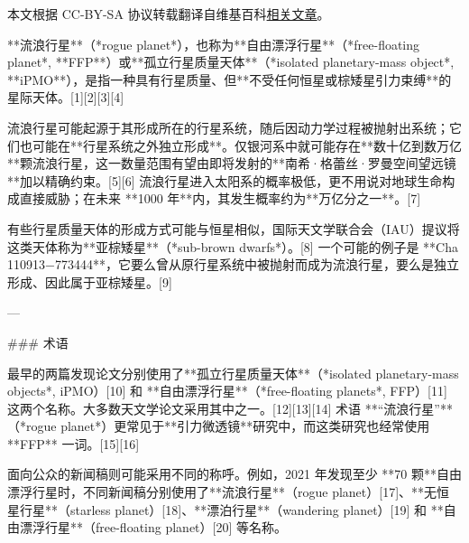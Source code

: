 
本文根据 CC-BY-SA 协议转载翻译自维基百科\href{https://en.wikipedia.org/wiki/Rogue_planet}{相关文章}。



**流浪行星**（*rogue planet*），也称为**自由漂浮行星**（*free-floating planet*, **FFP**）或**孤立行星质量天体**（*isolated planetary-mass object*, **iPMO**），是指一种具有行星质量、但**不受任何恒星或棕矮星引力束缚**的星际天体。[1][2][3][4]

流浪行星可能起源于其形成所在的行星系统，随后因动力学过程被抛射出系统；它们也可能在**行星系统之外独立形成**。仅银河系中就可能存在**数十亿到数万亿**颗流浪行星，这一数量范围有望由即将发射的**南希·格蕾丝·罗曼空间望远镜**加以精确约束。[5][6] 流浪行星进入太阳系的概率极低，更不用说对地球生命构成直接威胁；在未来 **1000 年**内，其发生概率约为**万亿分之一**。[7]

有些行星质量天体的形成方式可能与恒星相似，国际天文学联合会（IAU）提议将这类天体称为**亚棕矮星**（*sub-brown dwarfs*）。[8] 一个可能的例子是 **Cha 110913−773444**，它要么曾从原行星系统中被抛射而成为流浪行星，要么是独立形成、因此属于亚棕矮星。[9]

---

### 术语

最早的两篇发现论文分别使用了**孤立行星质量天体**（*isolated planetary-mass objects*, iPMO）[10] 和 **自由漂浮行星**（*free-floating planets*, FFP）[11] 这两个名称。大多数天文学论文采用其中之一。[12][13][14]
术语 **“流浪行星”**（*rogue planet*）更常见于**引力微透镜**研究中，而这类研究也经常使用 **FFP** 一词。[15][16]

面向公众的新闻稿则可能采用不同的称呼。例如，2021 年发现至少 **70 颗**自由漂浮行星时，不同新闻稿分别使用了**流浪行星**（rogue planet）[17]、**无恒星行星**（starless planet）[18]、**漂泊行星**（wandering planet）[19] 和 **自由漂浮行星**（free-floating planet）[20] 等名称。
